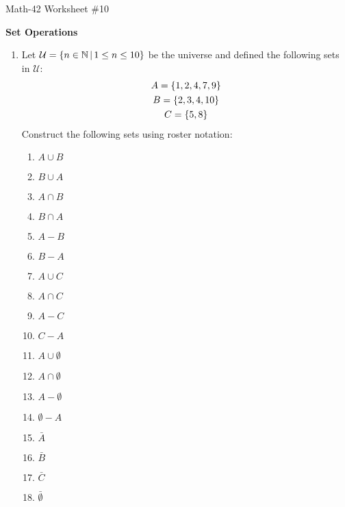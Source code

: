 \documentclass[letterpaper,12pt,fleqn]{article}
\newcommand{\U}{\mathcal{U}}
\begin{document}
\begin{center}
  \large Math-42 Worksheet \#10

  \textbf{Set Operations}
\end{center}

\vspace{0.5in}

\begin{enumerate}[left=0in,itemsep=0.5in]
\item Let \(\U=\setb{n\in\N}{1\le n\le10}\) be the universe and defined the following sets in \(\U\):
  \begin{gather*}
    A=\{1,2,4,7,9\} \\
    B=\{2,3,4,10\} \\
    C=\{5,8\} \\
  \end{gather*}
  Construct the following sets using roster notation:
  \begin{enumerate}
  \item \(A\cup B\)
  \item \(B\cup A\)
  \item \(A\cap B\)
  \item \(B\cap A\)
  \item \(A-B\)
  \item \(B-A\)
  \item \(A\cup C\)
  \item \(A\cap C\)
  \item \(A-C\)
  \item \(C-A\)
  \item \(A\cup\emptyset\)
  \item \(A\cap\emptyset\)
  \item \(A-\emptyset\)
  \item \(\emptyset-A\)
  \item \(\bar{A}\)
  \item \(\bar{B}\)
  \item \(\bar{C}\)
  \item \(\bar{\emptyset}\)
  \end{enumerate}


\end{enumerate}
\end{document}
